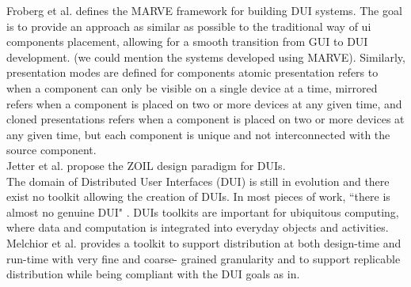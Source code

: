 Froberg et al. \cite{froberg2011model} defines the MARVE framework for building
DUI systems. The goal is to provide an approach as similar as possible to
the traditional way of ui components placement, allowing for a smooth
transition from GUI to DUI development. (we could mention the systems
developed using MARVE). Similarly, presentation modes are defined for
components atomic presentation refers to when a component can only be visible on a single
device at a time, mirrored refers when a component is placed on two or more
devices at any given time, and cloned presentations refers when a component is
placed on two or more devices at any given time, but each component is unique
and not interconnected with the source component.\\

Jetter et al. \cite{jetter2012design} propose the ZOIL design paradigm for
DUIs.\\
 
The domain of Distributed User Interfaces (DUI) is still in evolution and there exist no toolkit allowing the creation of DUIs.
In most pieces of work, ``there is almost no genuine
DUI" \cite{melchior2011distribution}. DUIs toolkits are important for ubiquitous
computing, where data and computation is integrated into everyday objects and activities.\cite{elmqvist2011distributed}\\
Melchior et al. \cite{melchior69toolkit} provides a toolkit to support
distribution at both design-time and run-time with very fine and coarse- grained granularity and to support replicable distribution while being compliant with the DUI goals as in.\\

